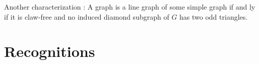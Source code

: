 \documentclass[11pt]{article}
\begin{document}
\begin{figure}[H]
\centering
	\begin{minipage}{.3\textwidth}
		\centering
		
	\end{minipage}
	\begin{minipage}{.3\textwidth}
		\centering
		
	\end{minipage}
	\begin{minipage}{.3\textwidth}
		\centering
		
	\end{minipage}
\end{figure}
\begin{figure}[H]
\centering
	\begin{minipage}{.3\textwidth}
		\centering
		
	\end{minipage}
	\begin{minipage}{.3\textwidth}
		\centering
		
	\end{minipage}
	\begin{minipage}{.3\textwidth}
		\centering
		
	\end{minipage}
\end{figure}
\begin{figure}[H]
\centering
	\begin{minipage}{.3\textwidth}
		\centering
		
	\end{minipage}
	\begin{minipage}{.3\textwidth}
		\centering
		
	\end{minipage}
	\begin{minipage}{.3\textwidth}
		\centering
		
	\end{minipage}
\end{figure}

Another characterization \cite{vanRooij}: A graph is a line graph of some
simple graph if and ly if it is claw-free and no induced diamond subgraph of
$G$ has two odd triangles.


\section{Recognitions}
\end{document}

